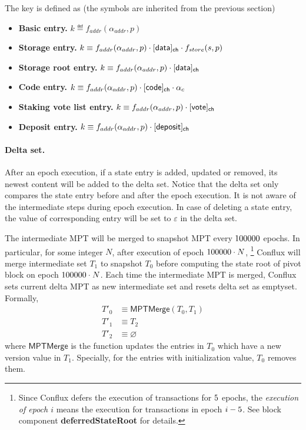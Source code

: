 The key is defined as (the symbols are inherited from the previous section)
\begin{itemize}[nosep]
	\item {\bf Basic entry.} $k\eqdef f_{addr}(\alpha_{addr},p)$
	\item {\bf Storage entry.} $k\equiv f_{addr}(\alpha_{addr},p)\cdot [{\sf data}]_{\sf ch}\cdot f_{store}(s,p)$
	\item {\bf Storage root entry.} $k\equiv f_{addr}(\alpha_{addr},p)\cdot [{\sf data}]_{\sf ch}$
	\item {\bf Code entry.} $k\equiv f_{addr}(\alpha_{addr},p)\cdot [{\sf code}]_{\sf ch}\cdot \alpha_c$
	\item {\bf Staking vote list entry.} $k\equiv f_{addr}(\alpha_{addr},p)\cdot [{\sf vote}]_{\sf ch}$
	\item {\bf Deposit entry.} $k\equiv f_{addr}(\alpha_{addr},p)\cdot [{\sf deposit}]_{\sf ch}$
 
\end{itemize}

\paragraph{Delta set.}

After an epoch execution, if a state entry is added, updated or removed, its newest content will be added to the delta set. Notice that the delta set only compares the state entry before and after the epoch execution. It is not aware of the intermediate steps during epoch execution. 
%
In case of deleting a state entry, the value of corresponding entry will be set to $\varepsilon$ in the delta set. 

The intermediate MPT will be merged to snapshot MPT every $100000$ epochs. In particular, for some integer $N$, after execution of epoch $100000\cdot N$, \footnote{Since Conflux defers the execution of transactions for ${5}$ epochs, the \emph{execution of epoch $i$} means the execution for transactions in epoch $i-{5}$. See block component {\bf deferredStateRoot} for details.} Conflux will merge intermediate set $T_1$ to snapshot $T_0$ before computing the state root of pivot block on epoch $100000\cdot N$. Each time the intermediate MPT is merged, Conflux sets current delta MPT as new intermediate set and resets delta set as emptyset. Formally,  
\begin{align}
	T'_0 &\equiv \mathsf{MPTMerge}(T_0,T_1) \\
	T'_1 &\equiv T_2 \\
	T'_2 &\equiv \varnothing
\end{align}
%
where $\mathsf{MPTMerge}$ is the function updates the entries in $T_0$ which have a new version value in $T_1$. Specially, for the entries with initialization value, $T_0$ removes them.  


